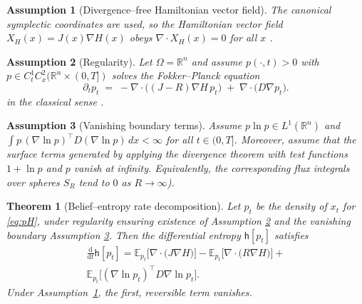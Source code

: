 \documentclass[final,5p,times,twocolumn]{elsarticle}
\newtheorem{theorem}{Theorem}
\newtheorem{assumption}{Assumption}
\newcommand{\diff}{\mathrm{d}}
\begin{document}
	\begin{assumption}[Divergence--free Hamiltonian vector field]\label{ass:divfree}
		The canonical symplectic coordinates are used, so the Hamiltonian vector field \(X_H(x)=J(x)\nabla H(x)\) obeys \(\nabla\!\cdot X_H(x)=0\) for all \(x\) \citep[Sec.~9]{Arnold1989}.
	\end{assumption}
	\begin{assumption}[Regularity]\label{ass:FP}
		Let $\Omega=\mathbb{R}^n$ and assume $p(\cdot,t)>0$ with $p\in C^1_t C^2_x(\mathbb{R}^n\times(0,T])$ solves the Fokker--Planck equation
		\begin{equation}\label{eq:fokkerPlanck}
			\partial_t p_t \;=\; -\nabla\!\cdot\big((J-R)\nabla H\,p_t\big)\;+\;\nabla\!\cdot\big(D\nabla p_t\big).
		\end{equation}
		in the classical sense \citep{Risken1996,Gardiner2009}.
	\end{assumption}
	\begin{assumption}[Vanishing boundary terms]\label{ass:IBP}
		Assume $p\ln p\in L^1(\mathbb{R}^n)$ and 
		$\int p\,(\nabla\ln p)^\top D(\nabla\ln p)\,dx<\infty$ for all $t\in(0,T]$. 
		Moreover, assume that the surface terms generated by applying the divergence theorem with test functions $1+\ln p$ and $p$ vanish at infinity. Equivalently, the corresponding flux integrals over spheres $S_R$ tend to $0$ as $R\to\infty$).
	\end{assumption}
	
	\begin{theorem}[Belief--entropy rate decomposition]\label{thm:entropy}
		Let \(p_t\) be the density of \(x_t\) for \eqref{eq:pH}, under regularity ensuring existence of Assumption \ref{ass:FP} and the vanishing boundary Assumption \ref{ass:IBP}.		
		Then the differential entropy \(\mathsf h[p_t]\) satisfies
		\begin{multline}\label{eq:entropy-rate}
			\frac{\diff}{\diff t}\mathsf h[p_t]
			=
			\mathbb E_{p_t}\big[\nabla \cdot\big(J\nabla H\big)\big]
			- \mathbb E_{p_t}\big[\nabla \cdot\big(R\nabla H\big)\big]
			+ \\ 
			\mathbb E_{p_t}\big[(\nabla \ln p_t)^\top D \nabla \ln p_t\big].
		\end{multline}
		Under Assumption~\ref{ass:divfree}, the first, reversible term vanishes.
	\end{theorem}
	
\end{document}
